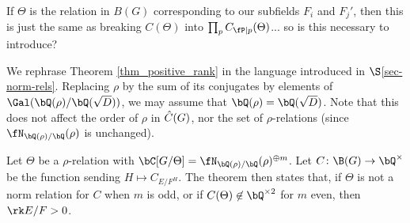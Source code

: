 {\color{red} If $\Theta$ is the relation in $B(G)$ corresponding to our subfields $F_i$ and $F_j'$, then this is just the same as breaking $C(\Theta)$ into $\prod_p C_{\fP \mid p}(\Theta)$... so is this necessary to introduce?}

\begin{rem}\label{rephrase-thm}
We rephrase Theorem \ref{thm_positive_rank} in the language introduced in $\S$\ref{sec-norm-rels}. 
Replacing $\rho$ by the sum of its conjugates by elements of $ \Gal(\bQ(\rho) / \bQ(\sqrt{D}))$, we may assume that $\bQ(\rho) = \bQ(\sqrt{D})$. Note that this does not affect the order of $\rho$ in $\hat{C}(G)$, nor the set of $\rho$-relations (since $\repnorm{\rho}$ is unchanged). 

Let $\Theta$ be a $\rho$-relation with $\bC[G / \Theta] = \repnorm{\rho}^{\oplus m}$. Let $C \colon \B(G) \to \bQ^{\times}$ be the function sending $H \mapsto C_{E / F^H}$. The theorem then states that, if $\Theta$ is not a norm relation for $C$ when $m$ is odd, or if $C(\Theta) \not\in \bQ^{\times 2}$ for $m$ even, then $ \rk E / F > 0$. 
\end{rem}




